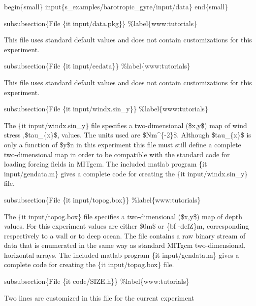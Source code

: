 \documentclass[letterpaper,10pt,english]{sphinxmanual}
\begin{document}
\begin{sphinxVerbatim}[commandchars=\\\{\}]
\end{sphinxVerbatim}

begin\{small\}
input\{s\_examples/barotropic\_gyre/input/data\}
end\{small\}

subsubsection\{File \{it input/data.pkg\}\}
\%label\{www:tutorials\}

This file uses standard default values and does not contain
customizations for this experiment.

subsubsection\{File \{it input/eedata\}\}
\%label\{www:tutorials\}

This file uses standard default values and does not contain
customizations for this experiment.

subsubsection\{File \{it input/windx.sin\_y\}\}
\%label\{www:tutorials\}

The \{it input/windx.sin\_y\} file specifies a two-dimensional (\$x,y\$)
map of wind stress ,\$tau\_\{x\}\$, values. The units used are \$Nm\textasciicircum{}\{-2\}\$.
Although \$tau\_\{x\}\$ is only a function of \$y\$n in this experiment
this file must still define a complete two-dimensional map in order
to be compatible with the standard code for loading forcing fields
in MITgcm. The included matlab program \{it input/gendata.m\} gives a complete
code for creating the \{it input/windx.sin\_y\} file.

subsubsection\{File \{it input/topog.box\}\}
\%label\{www:tutorials\}

The \{it input/topog.box\} file specifies a two-dimensional (\$x,y\$)
map of depth values. For this experiment values are either
\$0m\$ or \{bf -delZ\}m, corresponding respectively to a wall or to deep
ocean. The file contains a raw binary stream of data that is enumerated
in the same way as standard MITgcm two-dimensional, horizontal arrays.
The included matlab program \{it input/gendata.m\} gives a complete
code for creating the \{it input/topog.box\} file.

subsubsection\{File \{it code/SIZE.h\}\}
\%label\{www:tutorials\}

Two lines are customized in this file for the current experiment
\end{document}
